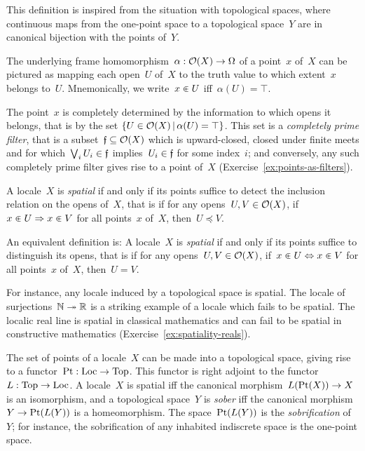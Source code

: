\documentclass{ws-rv9x6}
\begin{document}
{This definition is inspired from the situation with topological spaces, where
continuous maps from the one-point space to a topological space~$Y$ are in
canonical bijection with the points of~$Y$.

The underlying frame homomorphism~$\alpha : \mathcal{O}(X) \to \Omega$ of a point~$x$
of~$X$ can be pictured as mapping each open~$U$ of~$X$ to the truth value to which
extent~$x$ belongs to~$U$. Mnemonically, we write~$x \inplus U$ iff~$\alpha(U)
= \top$.

The point~$x$ is completely determined by the information to which opens it
belongs, that is by the set {$\{ U \in \mathcal{O}(X) \,|\, \alpha(U) = \top \}$}. This set is a \emph{completely
prime filter}, that is a subset~$\mathfrak{f} \subseteq \mathcal{O}(X)$ which is upward-closed,
closed under finite meets and for which~$\bigvee_i U_i \in \mathfrak{f}$ implies~$U_i
\in \mathfrak{f}$ for some index~$i$; and conversely, any such completely prime filter
gives rise to a point of~$X$ (Exercise~\ref{ex:points-as-filters}).

\begin{definition}A locale~$X$ is \emph{spatial} if and only if its points
suffice to detect the inclusion relation on the opens of~$X$, that is if for any opens~$U, V \in \mathcal{O}(X)$,
if~$x \inplus U \Rightarrow x \inplus V$ for all points~$x$ of~$X$, then~$U
\preceq V$.\end{definition}

An equivalent definition is: A locale~$X$ is \emph{spatial} if and only if its points
suffice to distinguish its opens, that is if for any opens~$U, V \in \mathcal{O}(X)$, if~$x \inplus U
\Leftrightarrow x \inplus V$ for all points~$x$ of~$X$, then~$U = V$.

For instance, any locale induced by a topological space is spatial. The locale
of surjections~$\mathbb{N} \twoheadrightarrow \mathbb{R}$ is a striking example of a locale which fails to be
spatial. The localic real line is spatial in classical mathematics and can
fail to be spatial in constructive mathematics (Exercise~\ref{ex:spatiality-reals}).

\begin{remark}\label{rem:definition-sober}
The set of points of a locale~$X$ can be made into a topological space, giving
rise to a functor~$\mathrm{Pt} : \mathrm{Loc} \to \mathrm{Top}$. This functor is right adjoint
to the functor~$L : \mathrm{Top} \to \mathrm{Loc}$. A locale~$X$ is spatial iff the canonical
morphism~$L(\mathrm{Pt}(X)) \to X$ is an isomorphism, and a topological space~$Y$
is \emph{sober} iff the canonical morphism~$Y \to \mathrm{Pt}(L(Y))$ is a
homeomorphism. The space~$\mathrm{Pt}(L(Y))$ is the \emph{sobrification} of~$Y$; for
instance, the sobrification of any inhabited indiscrete space is the one-point
space.


\end{remark}}
\end{document}
